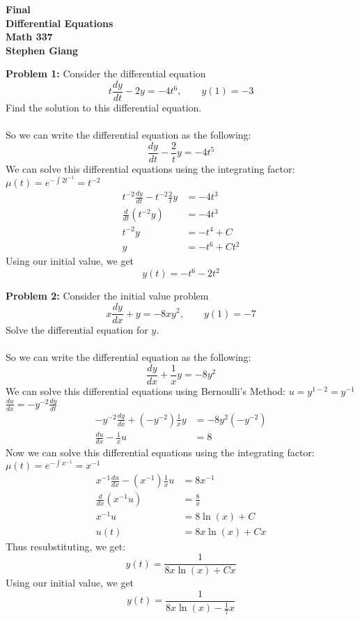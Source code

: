\documentclass[12pt]{article}
\begin{document}
	
	\begin{center}
		\textbf{Final} \\
		\textbf{Differential Equations} \\
		\textbf{Math 337} \\
		\textbf{Stephen Giang} \\
	\end{center}

\noindent \textbf{Problem 1: }Consider the differential equation
	$$
	t \frac{dy}{dt} - 2y = -4t^6, \qquad y(1) = -3
	$$
Find the solution to this differential equation.
\\ \\
So we can write the differential equation as the following:
	$$
	\frac{dy}{dt} - \frac{2}{t}y = -4t^5
	$$
We can solve this differential equations using the integrating factor: $\mu(t) = e^{-\int 2t^{-1}} = t^{-2}$
	\begin{align*}
		t^{-2}\frac{dy}{dt} - t^{-2}\frac{2}{t}y &= -4t^3 \\
		\frac{d}{dt}\left(t^{-2}y\right) &= -4t^3 \\
		t^{-2}y &= -t^4 + C \\
		y &= -t^6 + Ct^2
	\end{align*}
Using our initial value, we get 
	\boldmath
	$$
	y(t) = -t^6 - 2t^2
	$$
	\unboldmath

\newpage

\noindent \textbf{Problem 2: }Consider the initial value problem
	$$
	x \frac{dy}{dx} + y = -8xy^2, \qquad y(1) = -7
	$$
Solve the differential equation for $y$.
\\ \\
So we can write the differential equation as the following:
	$$
	\frac{dy}{dx} + \frac{1}{x}y = -8y^2
	$$
We can solve this differential equations using Bernoulli's Method: $u = y^{1-2} = y^{-1}$\\ $\frac{du}{dx} = -y^{-2}\frac{dy}{dt}
	$
	\begin{align*}
		-y^{-2}\frac{dy}{dx} + (-y^{-2})\frac{1}{x}y &= -8y^2(-y^{-2}) \\
		\frac{du}{dx} - \frac{1}{x}u &= 8
	\end{align*}
Now we can solve this differential equations using the integrating factor: $\mu(t) = e^{-\int x^{-1}} = x^{-1}$
	\begin{align*}
		x^{-1}\frac{du}{dx} - (x^{-1})\frac{1}{x}u &= 8x^{-1} \\
		\frac{d}{dx}(x^{-1}u) &= \frac{8}{x} \\
		x^{-1}u &= 8\ln(x) + C \\
		u(t) &= 8x\ln(x) + Cx
	\end{align*}
Thus resubstituting, we get:
	$$
	y(t) = \frac{1}{8x\ln(x) + Cx}
	$$
Using our initial value, we get 
	\boldmath
	$$
	y(t) = \frac{1}{8x\ln(x) - \frac{1}{7}x}
	$$
	\unboldmath
\end{document}
